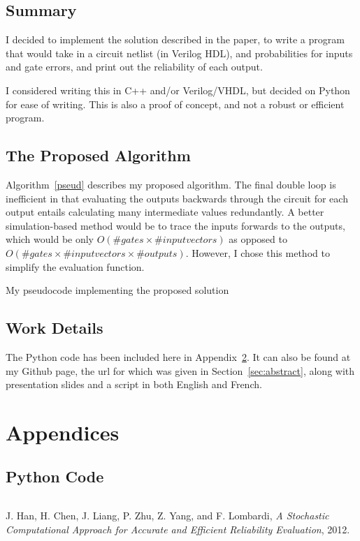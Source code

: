 \documentclass{article}
\begin{document}
\subsection{Summary}
I decided to implement the solution described in the paper, to write a program that would take in a circuit netlist (in Verilog HDL), and probabilities for inputs and gate errors, and print out the reliability of each output.

I considered writing this in C++ and/or Verilog/VHDL, but decided on Python for ease of writing. This is also a proof of concept, and not a robust or efficient program.

\subsection{The Proposed Algorithm}
Algorithm~\ref{pseud} describes my proposed algorithm. The final double loop is inefficient in that evaluating the outputs backwards through the circuit for each output entails calculating many intermediate values redundantly. A better simulation-based method would be to trace the inputs forwards to the outputs, which would be only $O(\#gates \times \#inputvectors)$ as opposed to $O(\#gates \times \#inputvectors \times \#outputs)$. However, I chose this method to simplify the evaluation function.

\begin{algorithm}[hp]
\caption{My pseudocode implementing the proposed solution}
\label{pseud}
\end{algorithm}

\subsection{Work Details}
The Python code has been included here in Appendix~\ref{app:code}. It can also be found at my Github page, the url for which was given in Section~\ref{sec:abstract}, along with presentation slides and a script in both English and French.
\section{Appendices}
\begin{appendices}
\section{Python Code}
\label{app:code}
\inputminted[]{python}{../stochastic.py}
\end{appendices}
\begin{thebibliography}{9}

  J. Han, H. Chen, J. Liang, P. Zhu, Z. Yang, and F. Lombardi,
  \emph{A Stochastic Computational Approach for Accurate and Efficient Reliability Evaluation},
  2012.

\end{thebibliography}
\end{document}
